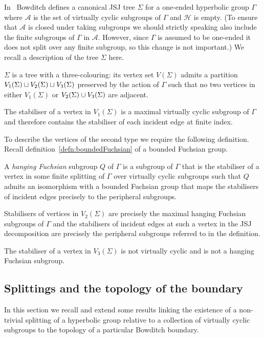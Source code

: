 In~\cite{bowditch98} Bowditch defines a canonical JSJ tree $\Sigma$ for a
one-ended hyperbolic group $\Gamma$ where $\mathcal{A}$ is the set of virtually
cyclic subgroups of $\Gamma$ and $\mathcal{H}$ is empty. (To ensure that
$\mathcal{A}$ is closed under taking subgroups we should strictly speaking also
include the finite subgroups of $\Gamma$ in $\mathcal{A}$. However, since
$\Gamma$ is assumed to be one-ended it does not split over any finite subgroup,
so this change is not important.) We recall a description of the tree $\Sigma$ here.

$\Sigma$ is a tree with a three-colouring: its vertex set $V(\Sigma)$ admits a
partition $V_1(\Sigma) \sqcup V_2(\Sigma) \sqcup V_3(\Sigma)$
preserved by the action of $\Gamma$ such that no two vertices in either
$V_1(\Sigma)$ or $V_2(\Sigma) \cup V_3(\Sigma)$ are adjacent.

The stabiliser of a vertex in $V_1(\Sigma)$ is a maximal virtually cyclic subgroup of
$\Gamma$ and therefore contains the stabiliser of each incident edge at finite
index.

To describe the vertices of the second type we require the following
definition. Recall definition~\ref{defn:boundedFuchsian} of a bounded Fuchsian
group.

\begin{defn} A \emph{hanging Fuchsian} subgroup $Q$ of $\Gamma$ is a subgroup
of $\Gamma$ that is the stabiliser of a vertex in some finite splitting of
$\Gamma$ over virtually cyclic subgroups such that $Q$ admits an isomorphism
with a bounded Fuchsian group that maps the stabilisers of incident
edges precisely to the peripheral subgroups.\end{defn}

Stabilisers of vertices in $V_2(\Sigma)$ are precisely the maximal hanging
Fuchsian subgroups of $\Gamma$ and the stabilisers of incident edges at such a
vertex in the JSJ decomposition are precisely the peripheral subgroups referred
to in the definition.

The stabiliser of a vertex in $V_3(\Sigma)$ is not virtually cyclic and is not
a hanging Fuchsian subgroup.

\subsection{Splittings and the topology of the boundary}\label{sec:splittingstopology}

In this section we recall and extend some results linking the existence of a
non-trivial splitting of a hyperbolic group relative to a collection of
virtually cyclic subgroups to the topology of a particular Bowditch boundary. 

